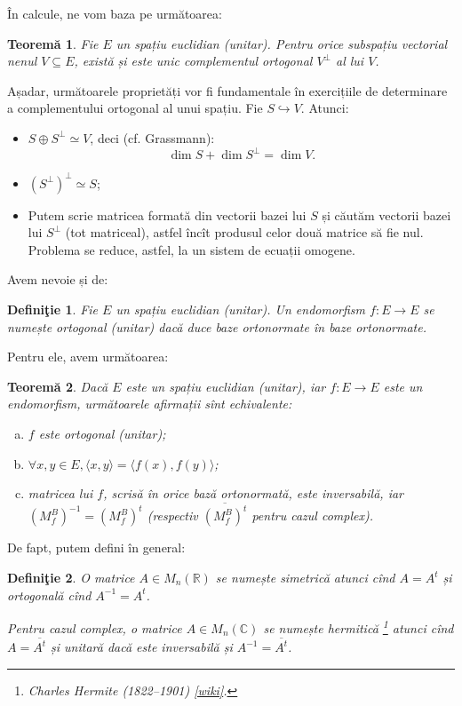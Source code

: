 \documentclass[11pt,a4paper]{article}
\newcommand\seq{\subseteq}
\newcommand\RR{\mathbb{R}}
\newcommand\CC{\mathbb{C}}
\theoremstyle{dotless}
\newtheorem{theorem}{Teorem\u{a}}[section]
\theoremstyle{dotlessdr}
\newtheorem{definition}{Defini\c{t}ie}[section]
\begin{document}
În calcule, ne vom baza pe următoarea:

\begin{theorem}\label{thm:comp-ort}
  Fie $E$ un spațiu euclidian (unitar). Pentru orice subspațiu vectorial nenul
  $V \seq E$, există și este unic complementul ortogonal $V^\perp$ al lui $V$.
\end{theorem}

Așadar, următoarele proprietăți vor fi fundamentale în exercițiile de
determinare a complementului ortogonal al unui spațiu. Fie $S \hookrightarrow V$.
Atunci:
\begin{itemize}
\item $S \oplus S^\perp \simeq V$, deci (cf. Grassmann):
  \[
    \dim S + \dim S^\perp = \dim V.
  \]
\item $(S^\perp)^\perp \simeq S$;
\item Putem scrie matricea formată din vectorii bazei lui $S$ și căutăm vectorii
  bazei lui $S^\perp$ (tot matriceal), astfel încît produsul celor două matrice
  să fie nul. Problema se reduce, astfel, la un sistem de ecuații omogene.
\end{itemize}

Avem nevoie și de:

\begin{definition}\label{def:end-ort}
  Fie $E$ un spațiu euclidian (unitar). Un endomorfism $f : E \to E$ se numește
  \emph{ortogonal (unitar)} dacă duce baze ortonormate în baze ortonormate.
\end{definition}

Pentru ele, avem următoarea:

\begin{theorem}\label{thm:car-end-ort}
  Dacă $E$ este un spațiu euclidian (unitar), iar $f : E \to E$ este un endomorfism,
  următoarele afirmații sînt echivalente:
  \begin{enumerate}[(a)]
  \item $f$ este ortogonal (unitar);
  \item $\forall x, y \in E, \langle x, y \rangle = \langle f(x), f(y) \rangle$;
  \item matricea lui $f$, scrisă în orice bază ortonormată, este inversabilă,
    iar $(M_f^B)^{-1} = (M_f^B)^t$ (respectiv $\overline{(M_f^B)^t}$ pentru cazul
    complex).
  \end{enumerate}
\end{theorem}

De fapt, putem defini în general:

\begin{definition}\label{def:mat-sim-ort}
  O matrice $A \in M_n(\RR)$ se numește \emph{simetrică} atunci cînd $A = A^t$
  și \emph{ortogonală} cînd $A^{-1} = A^t$.

  Pentru cazul complex, o matrice $A \in M_n(\CC)$ se numește \emph{hermitică}
  \footnote{Charles Hermite (1822--1901) %
    {\color{blue} \href{https://en.wikipedia.org/wiki/Charles_Hermite}{[wiki]}}.}
  atunci cînd $A = \overline{A^t}$ și \emph{unitară} dacă este inversabilă
  și $A^{-1} = \overline{A^t}$.
\end{definition}
\end{document}
